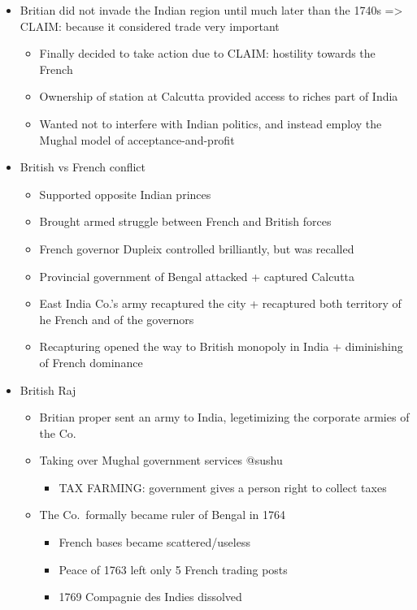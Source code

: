 \documentclass[letterpaper]{article}
\begin{document}
\begin{itemize}
\begin{itemize}
\item Britian did not invade the Indian region until much later than the
1740s => CLAIM: because it considered trade very important

\begin{itemize}
\item Finally decided to take action due to CLAIM: hostility towards the
French
\item Ownership of station at Calcutta provided access to riches part of
India
\item Wanted not to interfere with Indian politics, and instead employ
the Mughal model of acceptance-and-profit
\end{itemize}

\item British vs French conflict

\begin{itemize}
\item Supported opposite Indian princes
\item Brought armed struggle between French and British forces
\item French governor Dupleix controlled brilliantly, but was recalled
\item Provincial government of Bengal attacked + captured Calcutta
\item East India Co.'s army recaptured the city + recaptured both
territory of he French and of the governors
\item Recapturing opened the way to British monopoly in India +
diminishing of French dominance
\end{itemize}

\item British Raj

\begin{itemize}
\item Britian proper sent an army to India, legetimizing the corporate
armies of the Co.
\item Taking over Mughal government services @sushu

\begin{itemize}
\item TAX FARMING: government gives a person right to collect taxes
\end{itemize}

\item The Co. formally became ruler of Bengal in 1764

\begin{itemize}
\item French bases became scattered/useless
\item Peace of 1763 left only 5 French trading posts
\item 1769 Compagnie des Indies dissolved
\end{itemize}


\end{itemize}
\end{itemize}
\end{itemize}
\end{document}
